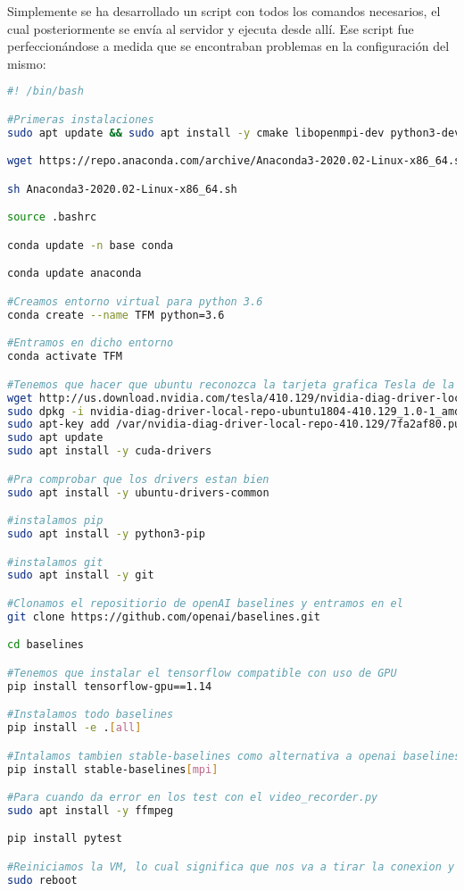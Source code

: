 \documentclass[11pt,fleqn]{book} %
\begin{document}
Simplemente se ha desarrollado un script con todos los comandos necesarios, el cual posteriormente se envía al servidor y ejecuta desde allí. Ese script fue perfeccionándose a medida que se encontraban problemas en la configuración del mismo: \\

\begin{lstlisting}[language=bash]
#! /bin/bash

#Primeras instalaciones
sudo apt update && sudo apt install -y cmake libopenmpi-dev python3-dev zlib1g-dev

wget https://repo.anaconda.com/archive/Anaconda3-2020.02-Linux-x86_64.sh

sh Anaconda3-2020.02-Linux-x86_64.sh

source .bashrc

conda update -n base conda

conda update anaconda

#Creamos entorno virtual para python 3.6
conda create --name TFM python=3.6

#Entramos en dicho entorno
conda activate TFM

#Tenemos que hacer que ubuntu reconozca la tarjeta grafica Tesla de la VM instalando sus drivers para ubuntu 18.04
wget http://us.download.nvidia.com/tesla/410.129/nvidia-diag-driver-local-repo-ubuntu1804-410.129_1.0-1_amd64.deb
sudo dpkg -i nvidia-diag-driver-local-repo-ubuntu1804-410.129_1.0-1_amd64.deb
sudo apt-key add /var/nvidia-diag-driver-local-repo-410.129/7fa2af80.pub
sudo apt update
sudo apt install -y cuda-drivers

#Pra comprobar que los drivers estan bien
sudo apt install -y ubuntu-drivers-common

#instalamos pip
sudo apt install -y python3-pip

#instalamos git
sudo apt install -y git

#Clonamos el repositiorio de openAI baselines y entramos en el
git clone https://github.com/openai/baselines.git

cd baselines

#Tenemos que instalar el tensorflow compatible con uso de GPU
pip install tensorflow-gpu==1.14

#Instalamos todo baselines
pip install -e .[all]

#Intalamos tambien stable-baselines como alternativa a openai baselines
pip install stable-baselines[mpi]

#Para cuando da error en los test con el video_recorder.py
sudo apt install -y ffmpeg

pip install pytest

#Reiniciamos la VM, lo cual significa que nos va a tirar la conexion y vamos a tener que volver a entrar por SSH
sudo reboot
\end{lstlisting} 
\end{document}
